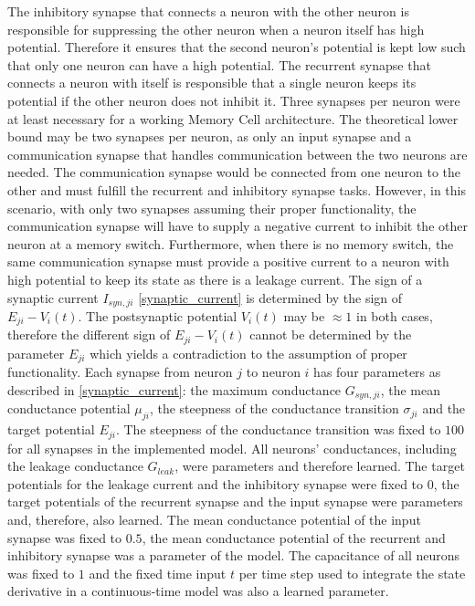 \documentclass[draft,final]{vutinfth} %
\begin{document}
    The inhibitory synapse that connects a neuron with the other neuron is responsible for suppressing the other neuron when a neuron itself has high potential. Therefore it ensures that the second neuron's potential is kept low such that only one neuron can have a high potential.
    The recurrent synapse that connects a neuron with itself is responsible that a single neuron keeps its potential if the other neuron does not inhibit it.
    Three synapses per neuron were at least necessary for a working Memory Cell architecture.
    The theoretical lower bound may be two synapses per neuron, as only an input synapse and a communication synapse that handles communication between the two neurons are needed.
    The communication synapse would be connected from one neuron to the other and must fulfill the recurrent and inhibitory synapse tasks.
    However, in this scenario, with only two synapses assuming their proper functionality, the communication synapse will have to supply a negative current to inhibit the other neuron at a memory switch.
    Furthermore, when there is no memory switch, the same communication synapse must provide a positive current to a neuron with high potential to keep its state as there is a leakage current.
    The sign of a synaptic current $I_{syn,ji}$ \ref{synaptic_current} is determined by the sign of $E_{ji} - V_i(t)$. 
    The postsynaptic potential $V_i(t)$ may be $\approx 1$ in both cases, therefore the different sign of $E_{ji} - V_i(t)$ cannot be determined by the parameter $E_{ji}$ which yields a contradiction to the assumption of proper functionality.
    Each synapse from neuron $j$ to neuron $i$ has four parameters as described in \ref{synaptic_current}: the maximum conductance $G_{syn,ji}$, the mean conductance potential $\mu_{ji}$, the steepness of the conductance transition $\sigma_{ji}$ and the target potential $E_{ji}$.
    The steepness of the conductance transition was fixed to $100$ for all synapses in the implemented model.
    All neurons' conductances, including the leakage conductance $G_{leak}$, were parameters and therefore learned.
    The target potentials for the leakage current and the inhibitory synapse were fixed to $0$, the target potentials of the recurrent synapse and the input synapse were parameters and, therefore, also learned.
    The mean conductance potential of the input synapse was fixed to $0.5$, the mean conductance potential of the recurrent and inhibitory synapse was a parameter of the model.
    The capacitance of all neurons was fixed to $1$ and the fixed time input $t$ per time step used to integrate the state derivative in a continuous-time model was also a learned parameter.
\end{document}
